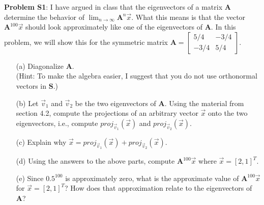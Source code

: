 \documentclass[12pt]{article}
\begin{document}
\noindent \textbf{Problem S1}: I have argued in class that the eigenvectors of a
matrix $\mathbf{A}$ determine the behavior of $\lim_{n\rightarrow \infty} 
\mathbf{A}^n \vec{x}$.  What this means is that the vector 
$\mathbf{A}^{100}\vec{x}$ should look approximately like one of the eigenvectors
of $\mathbf{A}$.  In this problem, we will show this for the symmetric matrix 
$\mathbf{A} =  \left[\begin{array}{cc} 5/4 & -3/4\\ -3/4 & 5/4\end{array}\right]
$. 
\begin{itemize}
\item[(a)] Diagonalize $\mathbf{A}$.\\  (Hint: To make the algebra easier, I 
suggest that you do not use orthonormal vectors in $\mathbf{S}$.)
\item[(b)] Let $\vec{v}_1$ and $\vec{v}_2$ be the two eigenvectors of 
$\mathbf{A}$.  Using the material from section 4.2, compute the projections of 
an arbitrary vector $\vec{x}$ onto the two eigenvectors, i.e., compute 
$proj_{\vec{v}_1}(\vec{x})$ and $proj_{\vec{v}_2}(\vec{x})$. 
\item[(c)] Explain why $\vec{x} = proj_{\vec{v}_1}(\vec{x})+proj_{\vec{v}_2}
(\vec{x})$.
\item[(d)] Using the answers to the above parts, compute 
$\mathbf{A}^{100}\vec{x}$ where $\vec{x} = [2,1]^T$.
\item[(e)] Since $0.5^{100}$ is approximately zero, what is the approximate 
value of $\mathbf{A}^{100}\vec{x}$ for $\vec{x} = [2,1]^T$? How does that 
approximation relate to the eigenvectors of $\mathbf{A}$?
\end{itemize}
\end{document}
